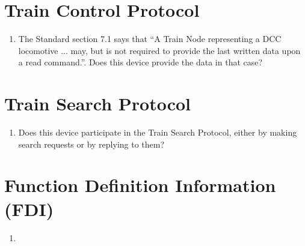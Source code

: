 \section{Train Control Protocol}
\begin{enumerate}
    \item The Standard section 7.1 says that
        ``A Train Node representing a DCC locomotive ... may, 
        but is not required to provide the last written data upon a read command.''.
        Does this device provide the data in that case?
\end{enumerate}

\section{Train Search Protocol}
\begin{enumerate}
    \item Does this device participate in the Train Search Protocol, 
            either by making search requests or by replying to them?
\end{enumerate}

\section{Function Definition Information (FDI)}
\begin{enumerate}
    \item 
\end{enumerate}


  
